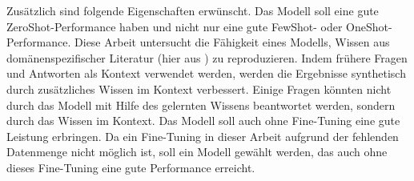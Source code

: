 Zusätzlich sind folgende Eigenschaften erwünscht.
Das Modell soll eine gute ZeroShot-Performance haben und nicht nur eine gute FewShot- oder OneShot-Performance.
Diese Arbeit untersucht die Fähigkeit eines Modells, Wissen aus domänenspezifischer Literatur (hier aus \citet{bb}) zu reproduzieren.
Indem frühere Fragen und Antworten als Kontext verwendet werden, werden die Ergebnisse synthetisch durch zusätzliches Wissen im Kontext verbessert.
Einige Fragen könnten nicht durch das Modell mit Hilfe des gelernten Wissens beantwortet werden, sondern durch das Wissen im Kontext.
Das Modell soll auch ohne Fine-Tuning eine gute Leistung erbringen.
Da ein Fine-Tuning in dieser Arbeit aufgrund der fehlenden Datenmenge nicht möglich ist, soll ein Modell gewählt werden, das auch ohne dieses Fine-Tuning eine gute Performance erreicht.\\

\begin{table}
    \centering
    \setlength{\tabcolsep}{5pt}
    \caption{Übersicht über die zur Auswahl stehenden Modelle.\label{tab:approach:models}}
\end{table}

